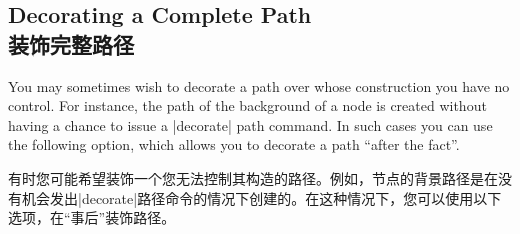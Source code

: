 \subsection{Decorating a Complete Path\\装饰完整路径}

You may sometimes wish to decorate a path over whose construction you have no
control. For instance, the path of the background of a node is created without
having a chance to issue a |decorate| path command. In such cases you can use
the following option, which allows you to decorate a path ``after the fact''.

有时您可能希望装饰一个您无法控制其构造的路径。例如，节点的背景路径是在没有机会发出|decorate|路径命令的情况下创建的。在这种情况下，您可以使用以下选项，在“事后”装饰路径。



